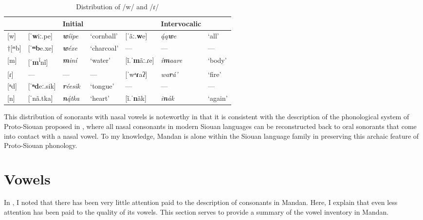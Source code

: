 \begin{table}
\caption{Distribution of /w/ and /ɾ/}\label{sonoranttable}
\begin{tabular}{lllllll}
\lsptoprule
	~&
	&
	Initial&
	~&
	&
	Intervocalic&
	~\\
\midrule

[w]&
	[ˈ\textbf{w}iː.pe]&
	\textit{\textbf{w}íipe}&
	`cornball'&
	[ˈãː.\textbf{w}e]&
	\textit{ą́ą\textbf{w}e}&
	`all'
	\\

$\dagger$[ᵐb]&
	[ˈ\textbf{ᵐb}e.xe]&
	\textit{\textbf{w}éxe}&
	`charcoal'&
	---&
	---&
	---\\

[m]&
	[ˈ\textbf{m}\textsuperscript{ĩ}nĩ]&
	\textit{\textbf{m}iní}&
	`water'&
	[ĩ.ˈ\textbf{m}ãː.ɾe]&
	\textit{í\textbf{m}aare}&
	`body'\\

[ɾ]&
	---&
	---&
	---&
	[ˈwᵃ\textbf{ɾ}aʔ]&
	\textit{{w}a\textbf{r}á'}&
	`fire'\\

[ⁿd]&
	[ˈ\textbf{ⁿd}eː.sik]&
	\textit{\textbf{r}éesik}&
	`tongue'&
	---&
	---&
	---\\

[n]&
	[ˈnã.tka]&
	\textit{\textbf{n}ą́tka}&
	`heart'&
	[ĩ.ˈ\textbf{n}ãk]&
	\textit{i\textbf{n}ák}&
	`again'\\
\midrule\hline

\end{tabular}

\end{table}

This distribution of sonorants with nasal vowels is noteworthy in that it is consistent with the description of the phonological system of Proto-Siouan proposed in \citet{rankinetalnd}, where all nasal consonants in modern Siouan languages can be reconstructed back to oral sonorants that come into contact with a nasal vowel. To my knowledge, Mandan is alone within the Siouan language family in preserving this archaic feature of Proto-Siouan phonology.

\section{Vowels}\label{SecVowels}
\largerpage
In , I noted that there has been very little attention paid to the description of consonants in Mandan. Here, I explain that even less attention has been paid to the quality of its vowels. This section serves to provide a summary of the vowel inventory in Mandan.

